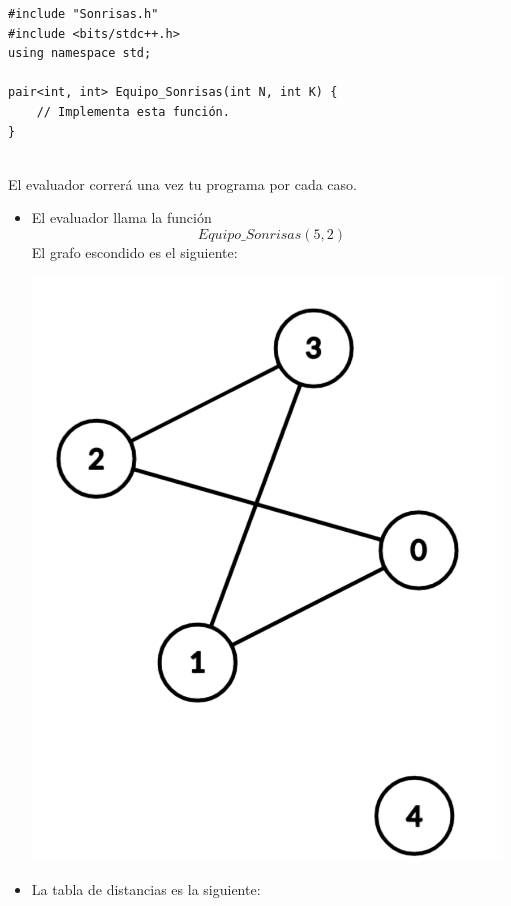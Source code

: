 \documentclass[12pt]{scrartcl}
\begin{document}
\begin{verbatim}
#include "Sonrisas.h"
#include <bits/stdc++.h>
using namespace std;

pair<int, int> Equipo_Sonrisas(int N, int K) {
    // Implementa esta función.
}
    
\end{verbatim}

    El evaluador correrá una vez tu programa por cada caso.
    

        \begin{itemize}
            \item El evaluador llama la función $$Equipo\_Sonrisas(5, 2)$$
            El grafo escondido es el siguiente:
            \begin{center}
                \includegraphics[scale=0.3]{ej1.png}
            \end{center}
            \item La tabla de distancias es la siguiente:
            

\end{itemize}
\end{document}
